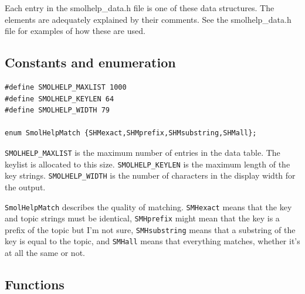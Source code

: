 \documentclass {scrbook}
\newcommand {\ttt} {\texttt}
\begin{document}
Each entry in the smolhelp\_data.h file is one of these data structures. The elements are adequately explained by their comments. See the smolhelp\_data.h file for examples of how these are used.

\subsection{Constants and enumeration}

\begin{lstlisting}
#define SMOLHELP_MAXLIST 1000
#define SMOLHELP_KEYLEN 64
#define SMOLHELP_WIDTH 79

enum SmolHelpMatch {SHMexact,SHMprefix,SHMsubstring,SHMall};
\end{lstlisting}

\ttt{SMOLHELP\_MAXLIST} is the maximum number of entries in the data table. The keylist is allocated to this size.
\ttt{SMOLHELP\_KEYLEN} is the maximum length of the key strings.
\ttt{SMOLHELP\_WIDTH} is the number of characters in the display width for the output.

\ttt{SmolHelpMatch} describes the quality of matching. \ttt{SMHexact} means that the key and topic strings must be identical, \ttt{SMHprefix} might mean that the key is a prefix of the topic but I'm not sure, \ttt{SMHsubstring} means that a substring of the key is equal to the topic, and \ttt{SMHall} means that everything matches, whether it's at all the same or not.

\subsection{Functions}
\end{document}
